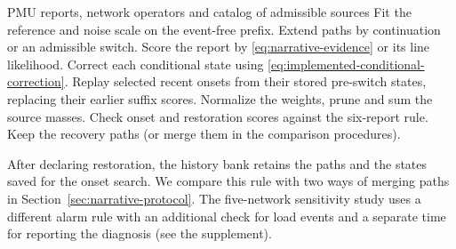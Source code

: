 \begin{algorithm}[t]
\caption{Attributing an intervention as reports arrive}
\label{alg:physical-history}
\begin{algorithmic}[1]
\Require PMU reports, network operators and catalog of admissible sources
\State Fit the reference and noise scale on the event-free prefix.
 \State Extend paths by continuation or an admissible switch.
 \State Score the report by \eqref{eq:narrative-evidence} or its line likelihood.
 \State Correct each conditional state using \eqref{eq:implemented-conditional-correction}.
 \State Replay selected recent onsets from their stored pre-switch states, replacing their earlier suffix scores.
 \State Normalize the weights, prune and sum the source masses.
 \State Check onset and restoration scores against the six-report rule.
   \State Keep the recovery paths (or merge them in the comparison procedures).
 \EndIf
\EndFor
\end{algorithmic}
\end{algorithm}

After declaring restoration, the history bank retains the paths and the
states saved for the onset search. We compare this rule with two ways of merging paths
in Section~\ref{sec:narrative-protocol}. The five-network sensitivity
study uses a different alarm rule with an additional check for load events
and a separate time for reporting the diagnosis (see the supplement).
